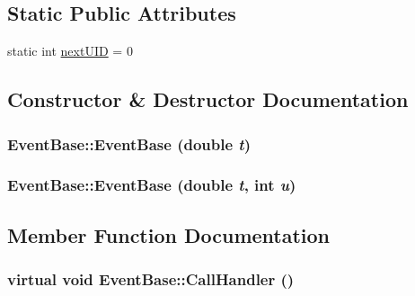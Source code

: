 \subsection*{Static Public Attributes}
\begin{CompactItemize}
\item 
static int \hyperlink{classEventBase_22a8c15e90a68f16042fd7b12dfe5935}{nextUID} = 0
\end{CompactItemize}


\subsection{Constructor \& Destructor Documentation}
\hypertarget{classEventBase_e95c43af6512ec2ab717eeb240ecad0a}{
\subsubsection[{EventBase}]{\setlength{\rightskip}{0pt plus 5cm}EventBase::EventBase (double {\em t})}}
\label{classEventBase_e95c43af6512ec2ab717eeb240ecad0a}


\hypertarget{classEventBase_0213a35ffa61ce4f7066128e89da5af8}{
\subsubsection[{EventBase}]{\setlength{\rightskip}{0pt plus 5cm}EventBase::EventBase (double {\em t}, \/  int {\em u})}}
\label{classEventBase_0213a35ffa61ce4f7066128e89da5af8}




\subsection{Member Function Documentation}
\hypertarget{classEventBase_121ca64dec88c8d9589c064b0060d037}{
\subsubsection[{CallHandler}]{\setlength{\rightskip}{0pt plus 5cm}virtual void EventBase::CallHandler ()}}
\label{classEventBase_121ca64dec88c8d9589c064b0060d037}




